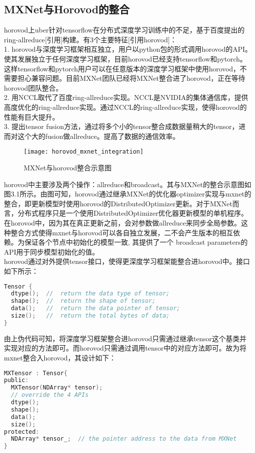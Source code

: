 \subsection{MXNet与Horovod的整合}
horovod上uber针对tensorflow在分布式深度学习训练中的不足，基于百度提出的ring-allreduce[引用]构建。有3个主要特征[引用horovod]：\\
1. horovod与深度学习框架相互独立，用户以python包的形式调用horovod的API。使其发展独立于任何深度学习框架，目前horovod已经支持tensorflow和pytorch。这样tensorflow和pytorch用户可以在任意版本的深度学习框架中使用horovod，不需要担心兼容问题。目前MXNet团队已经将MXNet整合进了horovod，正在等待horovod团队整合。\\
2. 用NCCL取代了百度ring-allreduce实现。NCCL是NVIDIA的集体通信库，提供高度优化的ring-allreduce实现。通过NCCL的ring-allreduce实现，使得horovod的性能有巨大提升。\\
3. 提出tensor fusion方法，通过将多个小的tensor整合成数据量稍大的tensor，进而对这个大的fusion做allreduce。提高了数据的通信效率。\\
\begin{figure}[htp]
\centering
\texttt{[image: horovod\_mxnet\_integration]}
\caption{MXNet与horovod整合示意图}
\end{figure}
horovod中主要涉及两个操作：allreduce和broadcast。其与MXNet的整合示意图如图3.1所示。由图可知，horovod通过继承MXNet的优化器optimizer实现与mxnet的整合，即更新模型时使用horovod的DistributedOptimizer更新。对于MXNet而言，分布式程序只是一个使用DistributedOptimizer优化器更新模型的单机程序。在horovod中，因为其在真正更新之前，会对参数做allreduce来同步全局参数。这种整合方式使得mxnet与horovod可以各自独立发展，二不会产生版本的相互依赖。为保证各个节点中初始化的模型一致, 其提供了一个 broadcast parameters的API用于同步模型初始化的值。\\
horovod通过对外提供tensor接口，使得更深度学习框架能整合进horovod中。接口如下所示：
\begin{lstlisting}[language=C, numbers=none]
Tensor {
  dtype();  //  return the data type of tensor;
  shape();  //  return the shape of tensor;
  data();   //  return the data pointer of tensor;
  size();   //  return the total bytes of data;
}
\end{lstlisting}
由上伪代码可知，将深度学习框架整合进horovod只需通过继承tensor这个基类并实现对应的方法即可。而horovod只需通过调用tensor中的对应方法即可。故为将mxnet整合入horovod，其设计如下：
\begin{lstlisting}[language=C, numbers=none]
MXTensor : Tensor{
public:
  MXTensor(NDArray* tensor);
  // override the 4 APIs
  dtype();
  shape();
  data();
  size();
protected:
  NDArray* tensor_;  // the pointer address to the data from MXNet
}
\end{lstlisting}

